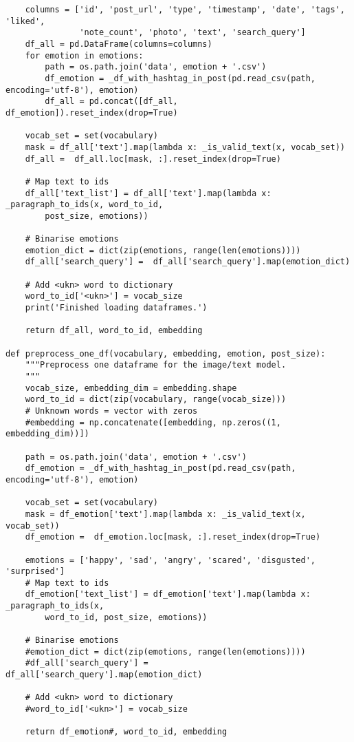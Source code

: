\begin{lstlisting}
    columns = ['id', 'post_url', 'type', 'timestamp', 'date', 'tags', 'liked',
               'note_count', 'photo', 'text', 'search_query']
    df_all = pd.DataFrame(columns=columns)
    for emotion in emotions:
        path = os.path.join('data', emotion + '.csv')
        df_emotion = _df_with_hashtag_in_post(pd.read_csv(path, encoding='utf-8'), emotion)
        df_all = pd.concat([df_all, df_emotion]).reset_index(drop=True)

    vocab_set = set(vocabulary)
    mask = df_all['text'].map(lambda x: _is_valid_text(x, vocab_set))
    df_all =  df_all.loc[mask, :].reset_index(drop=True)

    # Map text to ids
    df_all['text_list'] = df_all['text'].map(lambda x: _paragraph_to_ids(x, word_to_id, 
        post_size, emotions))

    # Binarise emotions
    emotion_dict = dict(zip(emotions, range(len(emotions))))
    df_all['search_query'] =  df_all['search_query'].map(emotion_dict)

    # Add <ukn> word to dictionary
    word_to_id['<ukn>'] = vocab_size
    print('Finished loading dataframes.')

    return df_all, word_to_id, embedding

def preprocess_one_df(vocabulary, embedding, emotion, post_size):
    """Preprocess one dataframe for the image/text model.
    """
    vocab_size, embedding_dim = embedding.shape
    word_to_id = dict(zip(vocabulary, range(vocab_size)))
    # Unknown words = vector with zeros
    #embedding = np.concatenate([embedding, np.zeros((1, embedding_dim))])

    path = os.path.join('data', emotion + '.csv')
    df_emotion = _df_with_hashtag_in_post(pd.read_csv(path, encoding='utf-8'), emotion)

    vocab_set = set(vocabulary)
    mask = df_emotion['text'].map(lambda x: _is_valid_text(x, vocab_set))
    df_emotion =  df_emotion.loc[mask, :].reset_index(drop=True)

    emotions = ['happy', 'sad', 'angry', 'scared', 'disgusted', 'surprised']
    # Map text to ids
    df_emotion['text_list'] = df_emotion['text'].map(lambda x: _paragraph_to_ids(x, 
        word_to_id, post_size, emotions))

    # Binarise emotions
    #emotion_dict = dict(zip(emotions, range(len(emotions))))
    #df_all['search_query'] =  df_all['search_query'].map(emotion_dict)

    # Add <ukn> word to dictionary
    #word_to_id['<ukn>'] = vocab_size

    return df_emotion#, word_to_id, embedding
\end{lstlisting}

